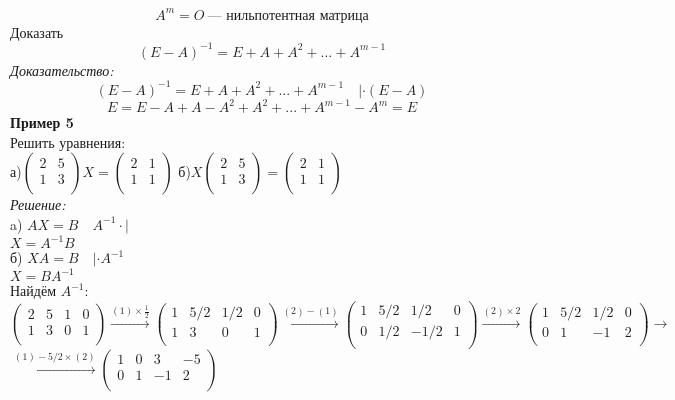 $$A^m=O\ \text{--- нильпотентная матрица}$$
Доказать $$(E-A)^{-1}=E+A+A^2+...+A^{m-1}$$
\textit{Доказательство:}
$$(E-A)^{-1}=E+A+A^2+...+A^{m-1}\quad |\cdot (E-A)$$
$$E=E-A+A-A^2+A^2+...+A^{m-1}-A^m=E$$
\textbf{Пример 5}\vspace{1mm}\\
Решить уравнения:\\
а)$\begin{pmatrix}
2 & 5\\
1 & 3\\
\end{pmatrix}
X=
\begin{pmatrix}
2 & 1\\
1 & 1\\
\end{pmatrix}
$
\qquad б)$X
\begin{pmatrix}
2 & 5\\
1 & 3\\
\end{pmatrix}
=
\begin{pmatrix}
2 & 1\\
1 & 1\\
\end{pmatrix}
$\vspace{1mm}\\
\textit{Решение:}\\
a) $AX=B\quad A^{-1}\cdot |$\\
$X=A^{-1}B$\\
б) $XA=B\quad |\cdot A^{-1}$\\
$X=BA^{-1}$\\
Найдём $A^{-1}$:\vspace{2mm}\\
$\left( \begin{array}{cc|cc}
2 & 5 & 1 & 0\\
1 & 3 & 0 & 1\\
\end{array} \right)
\xrightarrow{(1)\times \frac{1}{2}}
\left( \begin{array}{cc|cc}
1 & 5/2 & 1/2 & 0\\
1 & 3 & 0 & 1\\
\end{array} \right)
\xrightarrow{(2)-(1)}
\left( \begin{array}{cc|cc}
1 & 5/2 & 1/2 & 0\\
0 & 1/2 & -1/2 & 1\\
\end{array} \right)
\xrightarrow{(2)\times 2}
\left( \begin{array}{cc|cc}
1 & 5/2 & 1/2 & 0\\
0 & 1 & -1 & 2\\
\end{array} \right)\rightarrow
$\vspace{5mm}
$
\xrightarrow{(1)-5/2\times(2)}
\left( \begin{array}{cc|cc}
1 & 0 & 3 & -5\\
0 & 1 & -1 & 2\\
\end{array} \right)
$\vspace{2mm}

